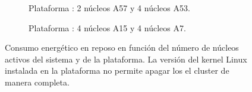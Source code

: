 \begin{figure}
  \centering
  \begin{subfigure}{0.9\textwidth}
    \centering
    \caption{Plataforma \juno: 2 núcleos \BIG A57 y 4 núcleos \LITTLE A53.}
      \label{}
    \end{subfigure}

    \vspace{0.5cm}

    \begin{subfigure}{0.9\textwidth}
      \centering
      \setlength{\fboxsep}{20pt} %
      \caption{Plataforma \odroid: 4 núcleos \BIG A15 y 4 núcleos \LITTLE A7.}
      \label{}
    \end{subfigure}  
    
  \caption[Consumo energético en función del número de cores activos en
  cada cluster]{Consumo energético en reposo en función del número de núcleos
    activos del sistema y de la plataforma. La versión del kernel Linux
    instalada en la plataforma \odroid no permite apagar los el cluster
    \LITTLE de manera completa.}
  \label{s5:fig:apagadoCores}
\end{figure}

